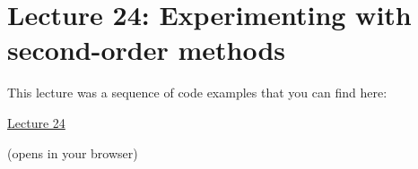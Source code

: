 \section{Lecture 24: Experimenting with second-order methods}

This lecture was a sequence of code examples that you can find here:

\begin{center}
{\Large
\href{https://ee227c.github.io/code/lecture24.html}{Lecture 24}
}

(opens in your browser)
\end{center}


